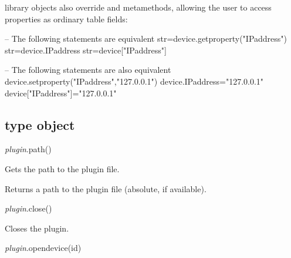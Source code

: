 \documentclass[a4paper,12pt,twoside,extrafontsizes]{memoir}
\begin{document}
\begin{funcdescr}
	 library objects also override  and  metamethods, allowing the user to access properties as ordinary table fields:
\end{funcdescr}

\begin{shellcmds}\begin{luacode}
-- The following statements are equivalent
str=device.getproperty("IPaddress")
str=device.IPaddress
str=device["IPaddress"]

-- The following statements are also equivalent
device.setproperty("IPaddress","127.0.0.1")
device.IPaddress="127.0.0.1"
device["IPaddress"]="127.0.0.1"
\end{luacode}\end{shellcmds}

\subsection{ type object}


\begin{luafuncprototype}
\emph{plugin}.path()
\end{luafuncprototype}

\begin{funcdescr}
	Gets the path to the plugin file.
\end{funcdescr}

\begin{funcret}
	Returns a path to the plugin file (absolute, if available).
\end{funcret}


\begin{luafuncprototype}
\emph{plugin}.close()
\end{luafuncprototype}

\begin{funcdescr}
	Closes the plugin.
\end{funcdescr}


\begin{luafuncprototype}
\emph{plugin}.opendevice(id)
\end{luafuncprototype}
\end{document}
